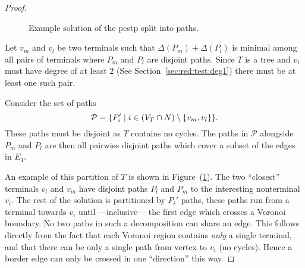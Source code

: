 \begin{proof}
\begin{figure}[h!]
  
  \caption{Example solution of the \gls{pcstp} split into paths.}\label{fig:pre:vor:pro}
\end{figure}

  Let $v_m$ and $v_l$ be two terminals such that $\Delta(P_m) + \Delta(P_l)$ is minimal among
  all pairs of terminals where $P_m$ and $P_l$ are disjoint paths. Since $T$ is a tree and
  $v_i$ must have degree of at least $2$ (See Section~\ref{sec:red:test:deg1}) there must
  be at least one such pair.

  Consider the set of paths
  $$\mathcal{P} = \{P_i' \mid i \in (V_T \cap N) \setminus \{v_m, v_l\} \}
  \mathnormal{.}$$
  These paths must be disjoint as $T$ contains no cycles. The paths in $\mathcal{P}$
  alongside $P_m$ and $P_l$ are then all pairwise disjoint paths which cover a subset of the
  edges
  in $E_T$.

An example of this partition of $T$ is shown in Figure~(\ref{fig:pre:vor:pro}). The two ``closest''
terminals $v_l$ and $v_m$ have disjoint paths $P_l$ and $P_m$ to the interesting nonterminal $v_i$.
The rest of the solution is partitioned by $P_i'$ paths, these paths run from a terminal towards $v_i$
until ---inclusive--- the first edge which crosses a Voronoi boundary. No two paths in such a decomposition
can share an edge. This follows directly from the fact that each Voronoi region contains
\textit{only} a single terminal, and that there can be only a single path from vertex to $v_i$ (no cycles).
Hence a border edge can only be crossed in one ``direction'' this way.


\end{proof}
